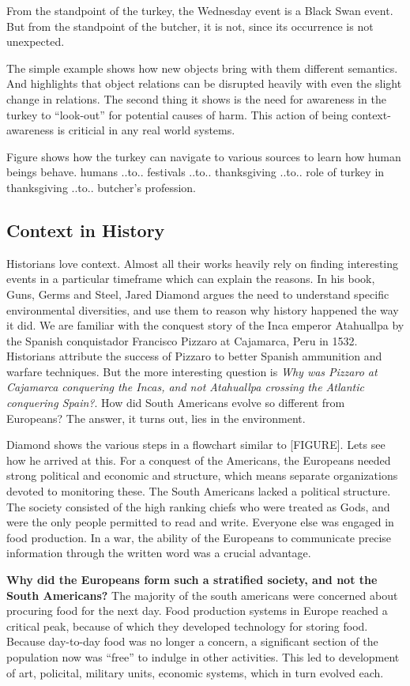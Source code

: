 From the standpoint of the turkey, the Wednesday event is a Black Swan event. But from the standpoint of the butcher, it is not, since its occurrence is not unexpected.

The simple example shows how new objects bring with them different semantics. And highlights that object relations can be disrupted heavily with even the slight change in relations. The second thing it shows is the need for awareness in the turkey to ``look-out'' for potential causes of harm. This action of being context-awareness is criticial in any real world systems.

Figure shows how the turkey can navigate to various sources to learn how human beings behave. humans ..to.. festivals ..to.. thanksgiving ..to.. role of turkey in thanksgiving ..to.. butcher's profession.

\subsection{Context in History}
Historians love context. Almost all their works heavily rely on finding interesting events in a particular timeframe which can explain the reasons. In his book, Guns, Germs and Steel, Jared Diamond argues the need to understand specific environmental diversities, and use them to reason why history happened the way it did. We are familiar with the conquest story of the Inca emperor Atahuallpa by the Spanish conquistador Francisco Pizzaro at Cajamarca, Peru in 1532. Historians attribute the success of Pizzaro to better Spanish ammunition and warfare techniques. But the more interesting question is \textit{Why was Pizzaro at Cajamarca conquering the Incas, and not Atahuallpa crossing the Atlantic conquering Spain?}. How did South Americans evolve so different from Europeans? The answer, it turns out, lies in the environment.

Diamond shows the various steps in a flowchart similar to [FIGURE]. Lets see how he arrived at this. For a conquest of the Americans, the Europeans needed strong political and economic and  structure, which means separate organizations devoted to monitoring these. The South Americans lacked a political structure. The society consisted of the high ranking chiefs who were treated as Gods, and were the only people permitted to read and write. Everyone else was engaged in food production. In a war, the ability of the Europeans to communicate precise information through the written word was a crucial advantage.

\textbf{Why did the Europeans form such a stratified society, and not the South Americans?} The majority of the south americans were concerned about procuring food for the next day. Food production systems in Europe reached a critical peak, because of which they developed technology for storing food. Because day-to-day food was no longer a concern, a significant section of the population now was ``free'' to indulge in other activities. This led to development of art, policital, military units, economic systems, which in turn evolved each.

